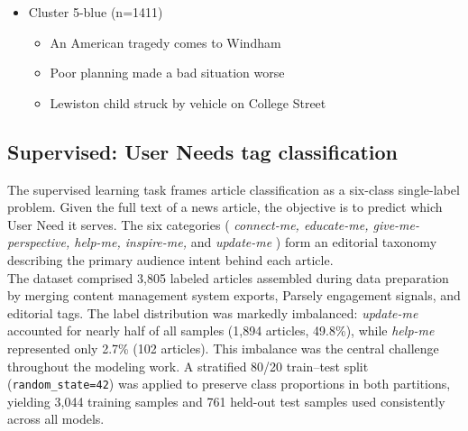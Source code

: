\documentclass[11pt]{article}
\begin{document}
\begin{itemize}
\begin{itemize}
        \item Augusta area frustrated by USPS staffing shortages, spotty mail delivery
        \item What if the Postal Service delivered the mail?
    \end{itemize}
    \item Cluster \textcolor{kmeans_6}{5-blue (n=1411)}
    \begin{itemize}
        \item An American tragedy comes to Windham
        \item Poor planning made a bad situation worse 
        \item Lewiston child struck by vehicle on College Street
    \end{itemize}
\end{itemize}

\subsection{Supervised: User Needs tag classification}
 
The supervised learning task frames article classification as a six-class single-label problem. Given the full text of a news article, the objective is to predict which User Need it serves. The six categories ( \textit{connect-me, educate-me, give-me-perspective, help-me, inspire-me,} and \textit{update-me} ) form an editorial taxonomy describing the primary audience intent behind each article. \\
 
\noindent The dataset comprised 3{,}805 labeled articles assembled during data preparation by merging content management system exports, Parsely engagement signals, and editorial tags. The label distribution was markedly imbalanced: \textit{update-me} accounted for nearly half of all samples (1{,}894 articles, 49.8\%), while \textit{help-me} represented only 2.7\% (102 articles). This imbalance was the central challenge throughout the modeling work. A stratified 80/20 train--test split (\texttt{random\_state=42}) was applied to preserve class proportions in both partitions, yielding 3{,}044 training samples and 761 held-out test samples used consistently across all models.
 
\end{document}
